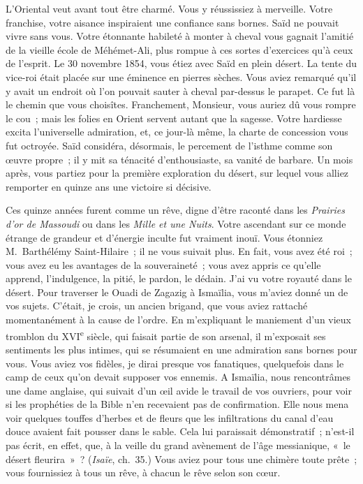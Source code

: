 \documentclass[french,twoside]{book} %
\newcommand\persName[1]{#1}
\newcommand\placeName[1]{#1}
\begin{document}
L’Oriental veut avant tout être charmé. Vous y réussissiez à merveille. Votre franchise, votre aisance inspiraient une confiance sans bornes. {\persName Saïd} ne pouvait vivre sans vous. Votre étonnante habileté à monter à cheval vous gagnait l’amitié de la vieille école de {\persName Méhémet-Ali}, plus rompue à ces sortes d’exercices qu’à ceux de l’esprit. Le 30 novembre 1854, vous étiez avec {\persName Saïd} en plein désert. La tente du vice-roi était placée sur une éminence en pierres sèches. Vous aviez remarqué qu’il y avait un endroit où l’on pouvait sauter à cheval par-dessus le parapet. Ce fut là le chemin que vous choisîtes. Franchement, Monsieur, vous auriez dû vous rompre le cou ; mais les folies en {\placeName Orient} servent autant que la sagesse. Votre hardiesse excita l’universelle admiration, et, ce jour-là même, la charte de concession vous fut octroyée. {\persName Saïd} considéra, désormais, le percement de l’isthme comme son œuvre propre ; il y mit sa ténacité d’enthousiaste, sa vanité de barbare. Un mois après, vous partiez pour la première exploration du désert, sur lequel vous alliez remporter en quinze ans une victoire si décisive.\par
Ces quinze années furent comme un rêve, digne d’être raconté dans les \emph{Prairies d’or de Massoudi} ou dans les \emph{Mille et une Nuits}. Votre ascendant sur ce monde étrange de grandeur et d’énergie inculte fut vraiment inouï. Vous étonniez {\persName M. Barthélémy Saint-Hilaire} ; il ne vous suivait plus. En fait, vous avez été roi ; vous avez eu les avantages de la souveraineté ; vous avez appris ce qu’elle apprend, l’indulgence, la pitié, le pardon, le dédain. J’ai vu votre royauté dans le désert. Pour traverser le {\placeName Ouadi de Zagazig} à {\placeName Ismaïlia}, vous m’aviez donné un de vos sujets. C’était, je crois, un ancien brigand, que vous aviez rattaché momentanément à la cause de l’ordre. En m’expliquant le maniement d’un vieux tromblon du XVI\textsuperscript{e} siècle, qui faisait partie de son arsenal, il m’exposait ses sentiments les plus intimes, qui se résumaient en une admiration sans bornes pour vous. Vous aviez vos fidèles, je dirai presque vos fanatiques, quelquefois dans le camp de ceux qu’on devait supposer vos ennemis. A {\placeName Ismaïlia}, nous rencontrâmes une dame anglaise, qui suivait d’un œil avide le travail de vos ouvriers, pour voir si les prophéties de la Bible n’en recevaient pas de confirmation. Elle nous mena voir quelques touffes d’herbes et de fleurs que les infiltrations du canal d’eau douce avaient fait pousser dans le sable. Cela lui paraissait démonstratif ; n’est-il pas écrit, en effet, que, à la veille du grand avènement de l’âge messianique, « le désert fleurira » ? (\emph{Isaïe}, ch. 35.) Vous aviez pour tous une chimère toute prête ; vous fournissiez à tous un rêve, à chacun le rêve selon son cœur.\par
\end{document}
